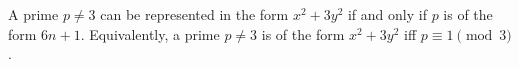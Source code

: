 A prime $p \neq 3$ can be represented in the form $x^2 + 3y^2$ if and only if $p$ is of the form $6n + 1$. Equivalently, a prime $p \neq 3$ is of the form $x^2 + 3y^2$ iff $p \equiv 1 \pmod{3}$.
